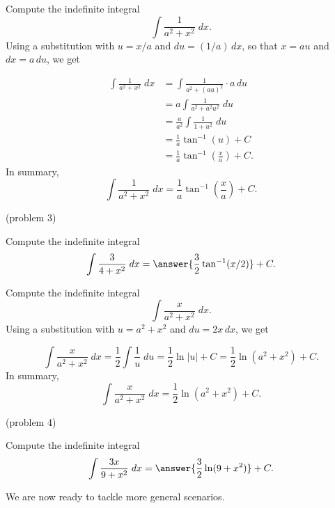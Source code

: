 \documentclass[handout]{ximera}
\begin{document}
\begin{example}[example 3]
Compute the indefinite integral
\[
\int \frac{1}{a^2 + x^2} \; dx.
\]
Using a substitution with $u = x/a$ and $du = (1/a) \, dx$, so that $x = au$ and $dx = a \, du$, we get

\begin{align*}
 \int \frac{1}{a^2 + x^2} \; dx &= \int \frac{1}{a^2 + (au)^2} \cdot a\, du   \\
 &= a\int \frac{1}{a^2 + a^2u^2} \; du   \\
 &= \frac{a}{a^2} \int \frac{1}{1+u^2} \; du \\
 &= \frac{1}{a} \tan^{-1}(u) + C \\
 &= \frac{1}{a} \tan^{-1}\left(\frac{x}{a}\right) + C.
 \end{align*}
 In summary,
 \[
\int \frac{1}{a^2 + x^2} \; dx =  \frac{1}{a} \tan^{-1}\left(\frac{x}{a}\right) + C.
\]
 \end{example}
 
 
 
 \begin{problem}(problem 3)
 
 Compute the indefinite integral
 \[
 \int \frac{3}{4+x^2} \; dx = \answer{\frac32 \tan^{-1}(x/2)} + C.
\]

 \end{problem}
 
 
 
 
\begin{example}[example 4]

Compute the indefinite integral
\[
\int \frac{x}{a^2 + x^2} \; dx.
\]
Using a substitution with $u = a^2 + x^2$ and $du = 2x \, dx$, we get

 \[
 \int \frac{x}{a^2 + x^2} \; dx = \frac12 \int \frac{1}{u} \; du   =  \frac{1}{2} \ln|u| + C =    
 \frac{1}{2} \ln(a^2 + x^2) + C.
 \]
 In summary,
 \[
\int \frac{x}{a^2 + x^2} \; dx =  \frac{1}{2}\ln(a^2 + x^2)  + C.
\]

\end{example}
 
 
 
 
\begin{problem}(problem 4)

Compute the indefinite integral
\[
 \int \frac{3x}{9+x^2} \; dx = \answer{\frac32 \ln(9+ x^2)} + C.
\]

\end{problem}
               
                    
We are now ready to tackle more general scenarios.
\end{document}
